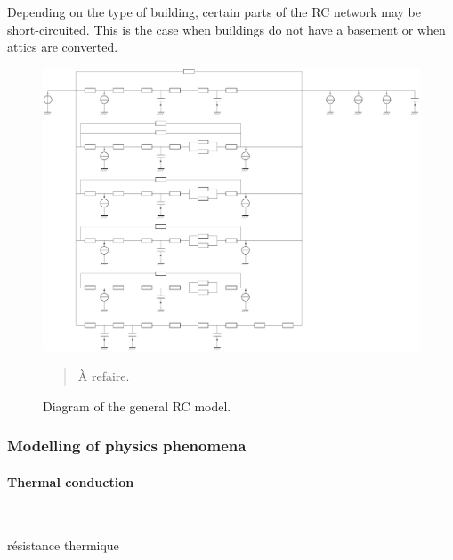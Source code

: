 \documentclass[11pt]{article}
\begin{document}
        Depending on the type of building, certain parts of the RC network may be short-circuited. This is the case when buildings do not have a basement or when attics are converted.

        \begin{figure}[ht]
            \centering
            \includegraphics[width=0.99\columnwidth]{figures/RC_genmod_unlabeled.pdf}
            \caption{\label{fig:rc_mod} Diagram of the general RC model.}
            \begin{quote}
                \vspace{-2mm}
                \small\noindent
                À refaire.
              \end{quote}
        \end{figure} 



        \subsubsection{Modelling of physics phenomena} %
        \label{ssub:model_computation}
        
            \paragraph{Thermal conduction}\mbox{}\\ %
            \label{par:thermal_conduction}
            
            résistance thermique\\
\end{document}
